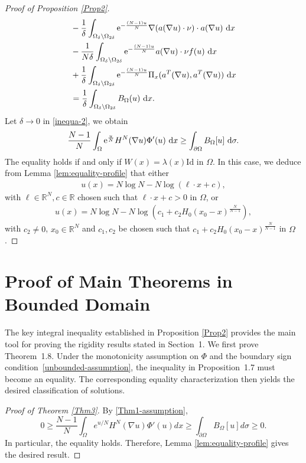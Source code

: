\documentclass[reqno, 11pt]{amsart} %
\numberwithin{equation}{section}
\theoremstyle{definition}
\newcommand{\pa}{\partial}
\newcommand{\R}{\mathbb{R}}
\newcommand{\e}{\textup{e}}
\newcommand{\dx}{\textup{d}x}
\begin{document}
\begin{proof}[Proof of Proposition \ref{Prop2}]
\begin{align}
        &  -\frac{1}{\delta} \int_{\Omega_{\delta} \backslash \Omega_{2\delta}} \e^{-\frac{(N-1)u}{N}} \nabla (a(\nabla u) \cdot \nu) \cdot a(\nabla u) \ \dx  \nonumber\\
        &  -\frac{1}{N\delta} \int_{\Omega_{\delta} \backslash \Omega_{2\delta}} \e^{-\frac{(N-1)u}{N}}  a(\nabla u) \cdot \nu f(u)  \ \dx  \\
        &   + \frac{1}{\delta} \int_{\Omega_{\delta} \backslash \Omega_{2\delta}} \e^{-\frac{(N-1)u}{N}} \Pi_x( a^T(\nabla u),a^T(\nabla u) ) \ \dx  \nonumber \\
        & = \frac{1}{\delta} \int_{\Omega_{\delta} \backslash \Omega_{2\delta}} B_{\Omega}(u) \ \dx. \nonumber
    \end{align}
    Let $\delta \to 0$ in \eqref{inequa-2}, we obtain
    \begin{align*}
        \frac{N-1}{N} \int_{\Omega} \e^{\frac{u}{N}} H^N(\nabla u) \Phi'(u) \ \dx \geq \int_{\pa \Omega} B_{\Omega}[u] \ \text{d} \sigma.
    \end{align*}
    The equality holds if and only if $W(x) = \lambda(x) \text{Id}$ in $\Omega$. In this case, we deduce from Lemma \ref{lem:equality-profile} that either
    \begin{align*}
        u(x) = N \log N - N \log (\ell \cdot x + c),
    \end{align*}
    with $\ell \in \R^N, c \in \R$ chosen such that $\ell \cdot x + c > 0 $ in $\Omega$, or
    \begin{align*}
        u(x) = N \log N - N \log (c_1 + c_2 H_0(x_0-x)^{\frac{N}{N-1}}),
    \end{align*}
    with $c_2 \neq 0$, $x_0 \in \R^N$ and $c_1, c_2$ be chosen such that $c_1 + c_2 H_0(x_0-x)^{\frac{N}{N-1}} $ in $\Omega$.
\end{proof}



\section{Proof of Main Theorems in Bounded Domain}\label{sec:sufficient}

The key integral inequality established in Proposition \ref{Prop2} provides the main tool for proving the rigidity results stated in Section~1. We first prove Theorem~1.8. Under the monotonicity assumption on $\Phi$ and the boundary sign condition~\eqref{unbounded-assumption}, the inequality in Proposition~1.7 must become an equality. The corresponding equality characterization then yields the desired classification of solutions.
\begin{proof}[Proof of Theorem \ref{Thm3}]
By \eqref{Thm1-assumption},
\[
       0 \geq \frac{N-1}{N}\int_\Omega e^{u/N}H^N(\nabla u)\Phi'(u)dx \geq \int_{\partial\Omega}B_\Omega[u]d\sigma\ge0 .
\]
In particular, the equality  holds. Therefore, Lemma \ref{lem:equality-profile} gives the desired result.
\end{proof}
\end{document}
